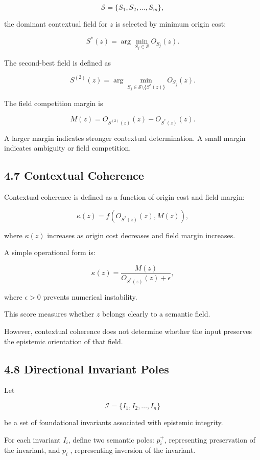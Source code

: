 \documentclass[11pt]{article}
\begin{document}
$$
\mathcal{S}
=
\{S_1,S_2,\dots,S_m\},
$$

the dominant contextual field for $z$ is selected by minimum origin cost:

$$
S^{*}(z)
=
\arg\min_{S_j\in\mathcal{S}}
O_{S_j}(z).
$$

The second-best field is defined as

$$
S^{(2)}(z)
=
\arg\min_{S_j\in\mathcal{S}\setminus\{S^{*}(z)\}}
O_{S_j}(z).
$$

The field competition margin is

$$
M(z)
=
O_{S^{(2)}(z)}(z)
-
O_{S^{*}(z)}(z).
$$

A larger margin indicates stronger contextual determination. A small margin indicates ambiguity or field competition.

\subsection{4.7 Contextual Coherence}

Contextual coherence is defined as a function of origin cost and field margin:

$$
\kappa(z)
=
f\left(
O_{S^{*}(z)}(z),
M(z)
\right),
$$

where $\kappa(z)$ increases as origin cost decreases and field margin increases.

A simple operational form is:

$$
\kappa(z)
=
\frac{
M(z)
}{
O_{S^{*}(z)}(z)+\epsilon
},
$$

where $\epsilon>0$ prevents numerical instability.

This score measures whether $z$ belongs clearly to a semantic field.

However, contextual coherence does not determine whether the input preserves the epistemic orientation of that field.

\subsection{4.8 Directional Invariant Poles}

Let

$$
\mathcal{I}=\{I_1,I_2,\dots,I_n\}
$$

be a set of foundational invariants associated with epistemic integrity.

For each invariant $I_i$, define two semantic poles: $p_i^{+}$, representing preservation of the invariant, and $p_i^{-}$, representing inversion of the invariant.
\end{document}
